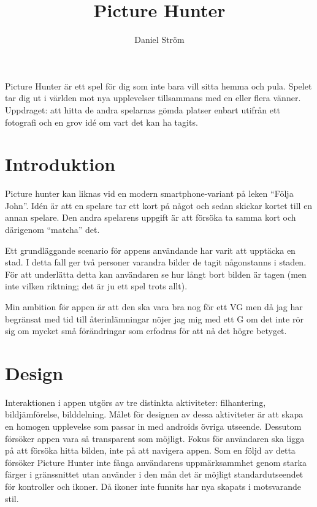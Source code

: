 \documentclass[11px, a4paper]{article}
\title{Picture Hunter}
\author{Daniel Ström \\ \mail{D@nielstrom.se}}
\begin{document}
\maketitle
	
\epigraph{%
	Picture Hunter är ett spel för dig som inte bara vill sitta hemma och pula. Spelet tar dig ut i världen mot nya upplevelser tillsammans med en eller flera vänner. Uppdraget: att hitta de andra spelarnas gömda platser enbart utifrån ett fotografi och en grov idé om vart det kan ha tagits.%
}{}

\tableofcontents

\listoffigures


\section{Introduktion}
	Picture hunter kan liknas vid en modern smartphone-variant på leken ``Följa John''. Idén är att en spelare tar ett kort på något och sedan skickar kortet till en annan spelare. Den andra spelarens uppgift är att försöka ta samma kort och därigenom ``matcha'' det.

	Ett grundläggande scenario för appens användande har varit att upptäcka en stad. I detta fall ger två personer varandra bilder de tagit någonstanns i staden. För att underlätta detta kan användaren se hur långt bort bilden är tagen (men inte vilken riktning; det är ju ett spel trots allt).

	Min ambition för appen är att den ska vara bra nog för ett VG men då jag har begränsat med tid till återinlämningar nöjer jag mig med ett G om det inte rör sig om mycket små förändringar som erfodras för att nå det högre betyget.


\section{Design}

	Interaktionen i appen utgörs av tre distinkta aktiviteter: filhantering, bildjämförelse,	bilddelning. Målet för designen av dessa aktiviteter är att skapa en homogen upplevelse som passar in med androids övriga utseende. Dessutom försöker appen vara så transparent som möjligt. Fokus för användaren ska ligga på att försöka hitta bilden, inte på att navigera appen. Som en följd av detta försöker Picture Hunter inte fånga användarens uppmärksammhet genom starka färger i gränssnittet utan använder i den mån det är möjligt standardutseendet för kontroller och ikoner. Då ikoner inte funnits har nya skapats i motsvarande stil.
\end{document}
